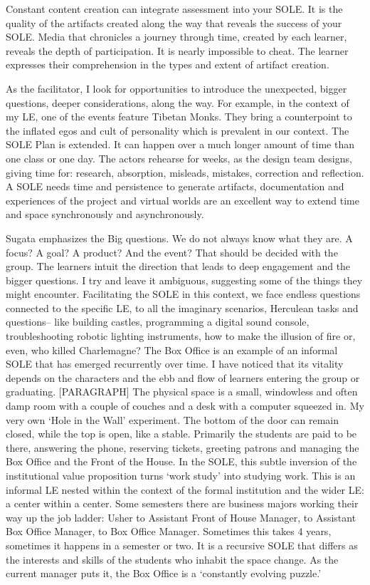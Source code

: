 Constant content creation can integrate assessment into your SOLE. It is
the quality of the artifacts created along the way that reveals the
success of your SOLE. Media that chronicles a journey through time,
created by each learner, reveals the depth of participation. It is
nearly impossible to cheat. The learner expresses their comprehension in
the types and extent of artifact creation.

As the facilitator, I look for opportunities to introduce the
unexpected, bigger questions, deeper considerations, along the way. For
example, in the context of my LE, one of the events feature Tibetan
Monks. They bring a counterpoint to the inflated egos and cult of
personality which is prevalent in our context. The SOLE Plan is
extended. It can happen over a much longer amount of time than one class
or one day. The actors rehearse for weeks, as the design team designs,
giving time for: research, absorption, misleads, mistakes, correction
and reflection. A SOLE needs time and persistence to generate artifacts,
documentation and experiences of the project and virtual worlds are an
excellent way to extend time and space synchronously and asynchronously.

Sugata emphasizes the Big questions. We do not always know what they
are. A focus? A goal? A product? And the event? That should be decided
with the group. The learners intuit the direction that leads to deep
engagement and the bigger questions. I try and leave it ambiguous,
suggesting some of the things they might encounter. Facilitating the
SOLE in this context, we face endless questions connected to the
specific LE, to all the imaginary scenarios, Herculean tasks and
questions-- like building castles, programming a digital sound console,
troubleshooting robotic lighting instruments, how to make the illusion
of fire or, even, who killed Charlemagne? The Box Office is an example
of an informal SOLE that has emerged recurrently over time. I have
noticed that its vitality depends on the characters and the ebb and flow
of learners entering the group or graduating. {[}PARAGRAPH{]} The
physical space is a small, windowless and often damp room with a couple
of couches and a desk with a computer squeezed in. My very own `Hole in
the Wall' experiment. The bottom of the door can remain closed, while
the top is open, like a stable. Primarily the students are paid to be
there, answering the phone, reserving tickets, greeting patrons and
managing the Box Office and the Front of the House. In the SOLE, this
subtle inversion of the institutional value proposition turns `work
study' into studying work. This is an informal LE nested within the
context of the formal institution and the wider LE: a center within a
center. Some semesters there are business majors working their way up
the job ladder: Usher to Assistant Front of House Manager, to Assistant
Box Office Manager, to Box Office Manager. Sometimes this takes 4 years,
sometimes it happens in a semester or two. It is a recursive SOLE that
differs as the interests and skills of the students who inhabit the
space change. As the current manager puts it, the Box Office is a
`constantly evolving puzzle.'

